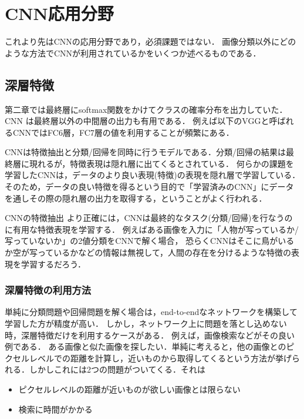 


\section{CNN応用分野}
これより先はCNNの応用分野であり，必須課題ではない．
画像分類以外にどのような方法でCNNが利用されているかをいくつか述べるものである．

\subsection{深層特徴}
第二章では最終層にsoftmax関数をかけてクラスの確率分布を出力していた．
CNN は最終層以外の中間層の出力も有用である．
例えば以下のVGGと呼ばれるCNNではFC6層，FC7層の値を利用することが頻繁にある．

CNNは特徴抽出と分類/回帰を同時に行うモデルである．分類/回帰の結果は最終層に現れるが，特徴表現は隠れ層に出てくるとされている．
何らかの課題を学習したCNNは，データのより良い表現(特徴)の表現を隠れ層で学習している．そのため，データの良い特徴を得るという目的で「学習済みのCNN」にデータを通しその際の隠れ層の出力を取得する，ということがよく行われる．


\begin{itembox}[l]{CNNの特徴抽出}
より正確には，CNNは最終的なタスク(分類/回帰)を行なうのに有用な特徴表現を学習する．
例えばある画像を入力に「人物が写っているか/写っていないか」の2値分類をCNNで解く場合，
恐らくCNNはそこに鳥がいるか空が写っているかなどの情報は無視して，人間の存在を分けるような特徴の表現を学習するだろう．
\end{itembox}


\subsubsection{深層特徴の利用方法}
単純に分類問題や回帰問題を解く場合は，end-to-endなネットワークを構築して学習した方が精度が高い．
しかし，ネットワーク上に問題を落とし込めない時，深層特徴だけを利用するケースがある．
例えば，画像検索などがその良い例である．
ある画像と似た画像を探したい．単純に考えると，他の画像とのピクセルレベルでの距離を計算し，近いものから取得してくるという方法が挙げられる．しかしこれには2つの問題がついてくる．それは

\begin{itemize}
	\item ピクセルレベルの距離が近いものが欲しい画像とは限らない
	\item 検索に時間がかかる
\end{itemize}


